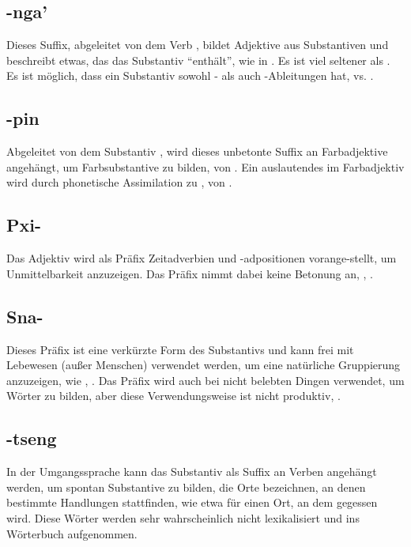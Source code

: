 \subsection{-nga'} Dieses Suffix, abgeleitet von dem Verb  , bildet Adjektive aus Substantiven und beschreibt etwas, das das Substantiv ``enthält'', wie in  . Es ist viel seltener als . Es ist möglich, dass ein Substantiv sowohl - als auch -Ableitungen hat,   vs.  .

\subsection{-pin} Abgeleitet von dem Substantiv  , wird dieses unbetonte Suffix an Farbadjektive angehängt, um Farbsubstantive zu bilden,   von  . Ein auslautendes  im Farbadjektiv wird durch phonetische Assimilation zu ,  von .

\subsection{Pxi-} Das Adjektiv   wird als Präfix Zeitadverbien und -adpositionen vorange-stellt, um Unmittelbarkeit anzuzeigen. Das Präfix nimmt dabei keine Betonung an,  ,  .

\subsection{Sna-} Dieses Präfix ist eine verkürzte Form des Substantivs   und kann frei mit Lebewesen (außer Menschen) verwendet werden, um eine natürliche Gruppierung anzuzeigen, wie  ,  .
Das Präfix wird auch bei nicht belebten Dingen verwendet, um Wörter zu bilden, aber diese Verwendungsweise ist nicht produktiv,  .

\subsection{-tseng} In der Umgangssprache kann das Substantiv   als Suffix an Verben angehängt werden, um spontan Substantive zu bilden, die Orte bezeichnen, an denen bestimmte Handlungen stattfinden, wie etwa  für einen Ort, an dem gegessen wird. Diese Wörter werden sehr wahrscheinlich nicht lexikalisiert und ins Wörterbuch aufgenommen.

